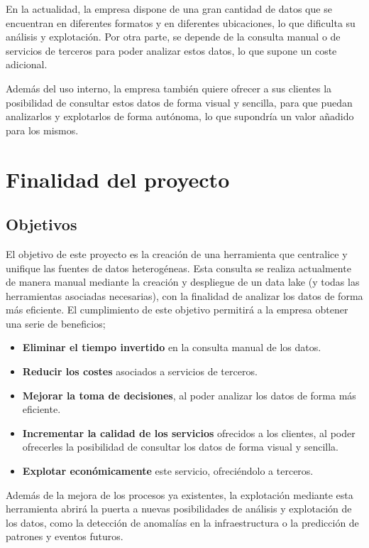 En la actualidad, la empresa dispone de una gran cantidad de datos que se encuentran en
diferentes formatos y en diferentes ubicaciones, lo que dificulta su análisis y explotación.
Por otra parte, se depende de la consulta manual o de servicios de terceros para poder analizar
estos datos, lo que supone un coste adicional.

Además del uso interno, la empresa también quiere ofrecer a sus clientes la posibilidad de
consultar estos datos de forma visual y sencilla, para que puedan analizarlos y explotarlos de
forma autónoma, lo que supondría un valor añadido para los mismos.

\section{Finalidad del proyecto}\label{sec:finalidad}
\subsection{Objetivos}\label{subsec:objetivos}
El objetivo de este proyecto es la creación de una herramienta que centralice y unifique las
fuentes de datos heterogéneas. Esta consulta se realiza actualmente de manera manual mediante
la creación y despliegue de un data lake (y todas las herramientas asociadas necesarias), con
la finalidad de analizar los datos de forma más eficiente. El cumplimiento de este objetivo
permitirá a la empresa obtener una serie de beneficios;

\begin{itemize}
	\item \textbf{Eliminar el tiempo invertido} en la consulta manual de los datos.
	\item \textbf{Reducir los costes} asociados a servicios de terceros.
	\item \textbf{Mejorar la toma de decisiones}, al poder analizar los datos de forma más eficiente.
	\item \textbf{Incrementar la calidad de los servicios} ofrecidos a los clientes, al poder ofrecerles
	    la posibilidad de consultar los datos de forma visual y sencilla.
	\item \textbf{Explotar económicamente} este servicio, ofreciéndolo a terceros.
\end{itemize}

Además de la mejora de los procesos ya existentes, la explotación mediante esta herramienta
abrirá la puerta a nuevas posibilidades de análisis y explotación de los datos, como la detección
de anomalías en la infraestructura o la predicción de patrones y eventos futuros.

